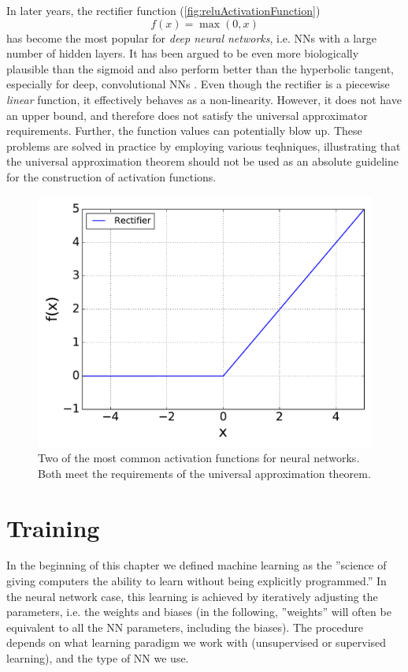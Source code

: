 \documentclass[twoside,english]{uiofysmaster}
\begin{document}
In later years, the rectifier function (\autoref{fig:reluActivationFunction})
\begin{equation}
 f(x) = \max(0,x)
\end{equation}
has become the most popular \cite{LeCun15} for \textit{deep neural networks}, i.e. NNs with a large number of hidden layers.
It has been argued to be even more biologically plausible than the sigmoid and also perform better
than the hyperbolic tangent, especially for deep, convolutional NNs \cite{Glorot11}. Even though the rectifier is a
piecewise \textit{linear} function, it effectively behaves as a non-linearity. However, it does not have an upper bound, and
therefore does not satisfy the universal approximator requirements. Further, the function values can potentially blow up. 
These problems are solved in practice by employing various teqhniques, illustrating that the universal approximation theorem
should not be used as an absolute guideline for the construction of activation functions. 
\begin{figure}
\begin{center}
 \includegraphics[width = 0.7\linewidth]{Figures/Theory/reluActivation.pdf}
  \caption{Two of the most common activation functions for neural networks. Both meet the requirements
	   of the universal approximation theorem.}
  \label{fig:reluActivationFunction}
  \end{center}
\end{figure}


\section{Training} \label{sec:training}
In the beginning of this chapter we defined machine learning as the ''science of giving computers the ability to learn without
being explicitly programmed.'' In the neural network case, this learning is achieved by iteratively adjusting 
the parameters, i.e. the weights and biases (in the following, ''weights'' will often be equivalent to all 
the NN parameters, including the biases).
The procedure depends on what learning paradigm we work with
(unsupervised or supervised learning), and the type of NN we use. 
\end{document}
